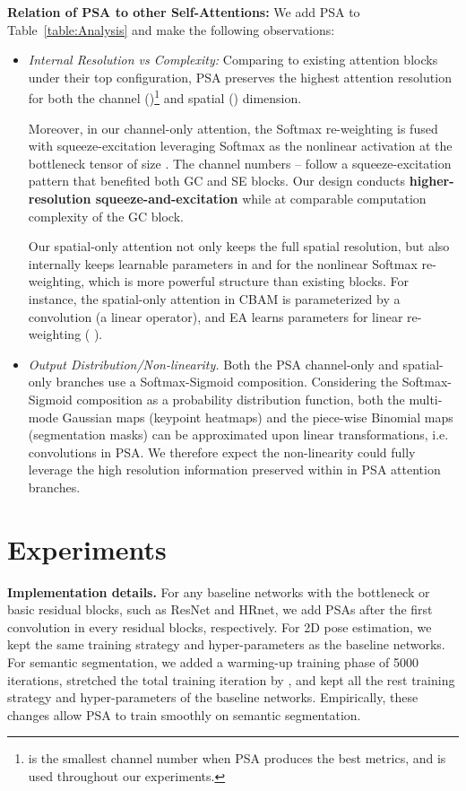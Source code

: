 \documentclass[10pt,twocolumn,letterpaper]{article}
\begin{document}
\textbf{Relation of PSA to other Self-Attentions:} We add PSA to Table~\ref{table:Analysis} and make the following observations: 
\begin{itemize}
    \item \textit{Internal Resolution vs Complexity:} Comparing to existing attention blocks under their top configuration, PSA preserves the highest attention resolution for both the channel ()\footnote{ is the smallest channel number when PSA produces the best metrics, and is used throughout our experiments.} and spatial () dimension. 
    
    Moreover, in our channel-only attention, the Softmax re-weighting is fused with squeeze-excitation leveraging Softmax as the nonlinear activation at the bottleneck tensor of size . The channel numbers -- follow a squeeze-excitation pattern that benefited both GC and SE blocks. Our design conducts \textbf{higher-resolution squeeze-and-excitation} while at comparable computation complexity of the GC block. 
    
    Our spatial-only attention not only keeps the full  spatial resolution, but also internally keeps  learnable parameters in  and  for the nonlinear Softmax re-weighting, which is more powerful structure than existing blocks. For instance, the spatial-only attention in CBAM is parameterized by a  convolution (a linear operator), and EA learns  parameters for linear re-weighting ( ). 

    \item \textit{Output Distribution/Non-linearity.} Both the PSA channel-only and spatial-only branches use a Softmax-Sigmoid composition. Considering the Softmax-Sigmoid composition as a probability distribution function, both the multi-mode Gaussian maps (keypoint heatmaps) and the piece-wise Binomial maps (segmentation masks) can be approximated upon linear transformations, i.e.  convolutions in PSA. We therefore expect the non-linearity could fully leverage the high resolution information preserved within in PSA attention branches.
\end{itemize}
  




\section{Experiments}
\textbf{Implementation details.} For any baseline networks with the bottleneck or basic residual blocks, such as ResNet and HRnet, we add PSAs after the first  convolution in every residual blocks, respectively. For 2D pose estimation, we kept the same training strategy and hyper-parameters as the baseline networks. For semantic segmentation, we added a warming-up training phase of 5000 iterations, stretched the total training iteration by , and kept all the rest training strategy and hyper-parameters of the baseline networks. Empirically, these changes allow PSA to train smoothly on semantic segmentation. 
\end{document}
